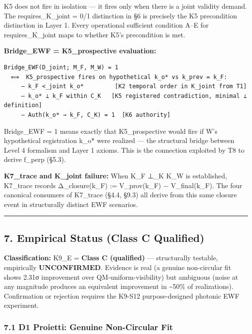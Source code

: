 \documentclass[
  11pt,
]{article}
\begin{document}
K5 does not fire in isolation --- it fires only when there is a joint
validity demand. The requires\_K\_joint = 0/1 distinction in §6 is
precisely the K5 precondition distinction in Layer 1. Every operational
sufficient condition A--E for requires\_K\_joint maps to whether K5's
precondition is met.

\textbf{Bridge\_EWF = K5\_prospective evaluation:}

\begin{verbatim}
Bridge_EWF(D_joint; M_F, M_W) = 1
  ⟺  K5_prospective fires on hypothetical k_o* vs k_prev = k_F:
     — k_F <_joint k_o*         [K2 temporal order in K_joint from T1]
     — k_o* ⊥ k_F within C_K   [K5 registered contradiction, minimal ⊥ definition]
     — Auth(k_o* → k_F, C_K) = 1  [K6 authority]
\end{verbatim}

Bridge\_EWF = 1 means exactly that K5\_prospective would fire if W's
hypothetical registration k\_o* were realized --- the structural bridge
between Level 4 formalism and Layer 1 axioms. This is the connection
exploited by T8 to derive f\_perp (§5.3).

\textbf{K7\_trace and K\_joint failure:} When K\_F ⊥\_K K\_W is
established, K7\_trace records Δ\_closure(k\_F) := V\_prov(k\_F) −
V\_final(k\_F). The four canonical consumers of K7\_trace (§4.4, §9.3)
all derive from this same closure event in structurally distinct EWF
scenarios.

\begin{center}\rule{0.5\linewidth}{0.5pt}\end{center}

\subsection{7. Empirical Status (Class C
Qualified)}\label{empirical-status-class-c-qualified}

\textbf{Classification:} K9\_E = \textbf{Class C (qualified)} ---
structurally testable, empirically \textbf{UNCONFIRMED}. Evidence is
real (a genuine non-circular fit shows 2.31σ improvement over
QM-uniform-visibility) but ambiguous (noise at any magnitude produces an
equivalent improvement in \textasciitilde50\% of realizations).
Confirmation or rejection requires the K9-S12 purpose-designed photonic
EWF experiment.

\subsubsection{7.1 D1 Proietti: Genuine Non-Circular
Fit}\label{d1-proietti-genuine-non-circular-fit}
\end{document}
